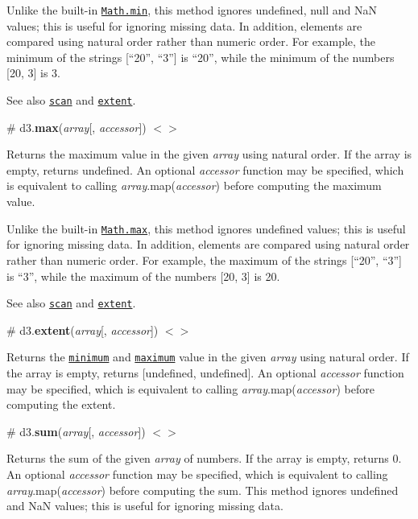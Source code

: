 Unlike the built-\/in \href{https://developer.mozilla.org/en/JavaScript/Reference/Global_Objects/Math/min}{\tt Math.\+min}, this method ignores undefined, null and NaN values; this is useful for ignoring missing data. In addition, elements are compared using natural order rather than numeric order. For example, the minimum of the strings \mbox{[}“20”, “3”\mbox{]} is “20”, while the minimum of the numbers \mbox{[}20, 3\mbox{]} is 3.

See also \href{#scan}{\tt scan} and \href{#extent}{\tt extent}.

\label{_max}%
\# d3.{\bfseries max}({\itshape array}\mbox{[}, {\itshape accessor}\mbox{]}) \href{https://github.com/d3/d3-array/blob/master/src/max.js}{\tt $<$$>$}

Returns the maximum value in the given {\itshape array} using natural order. If the array is empty, returns undefined. An optional {\itshape accessor} function may be specified, which is equivalent to calling {\itshape array}.map({\itshape accessor}) before computing the maximum value.

Unlike the built-\/in \href{https://developer.mozilla.org/en/JavaScript/Reference/Global_Objects/Math/max}{\tt Math.\+max}, this method ignores undefined values; this is useful for ignoring missing data. In addition, elements are compared using natural order rather than numeric order. For example, the maximum of the strings \mbox{[}“20”, “3”\mbox{]} is “3”, while the maximum of the numbers \mbox{[}20, 3\mbox{]} is 20.

See also \href{#scan}{\tt scan} and \href{#extent}{\tt extent}.

\label{_extent}%
\# d3.{\bfseries extent}({\itshape array}\mbox{[}, {\itshape accessor}\mbox{]}) \href{https://github.com/d3/d3-array/blob/master/src/extent.js}{\tt $<$$>$}

Returns the \href{#min}{\tt minimum} and \href{#max}{\tt maximum} value in the given {\itshape array} using natural order. If the array is empty, returns \mbox{[}undefined, undefined\mbox{]}. An optional {\itshape accessor} function may be specified, which is equivalent to calling {\itshape array}.map({\itshape accessor}) before computing the extent.

\label{_sum}%
\# d3.{\bfseries sum}({\itshape array}\mbox{[}, {\itshape accessor}\mbox{]}) \href{https://github.com/d3/d3-array/blob/master/src/sum.js}{\tt $<$$>$}

Returns the sum of the given {\itshape array} of numbers. If the array is empty, returns 0. An optional {\itshape accessor} function may be specified, which is equivalent to calling {\itshape array}.map({\itshape accessor}) before computing the sum. This method ignores undefined and NaN values; this is useful for ignoring missing data.

